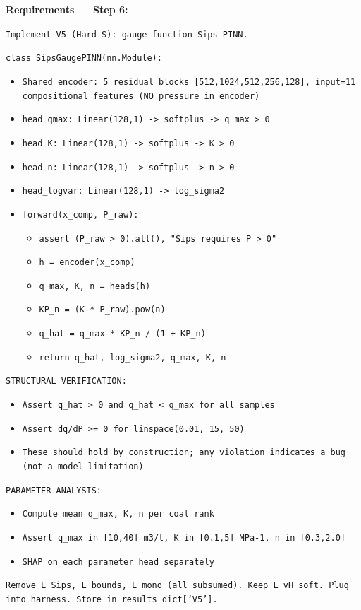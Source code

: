 \documentclass[12pt,a4paper]{article}
\begin{document}
\begin{promptbox}
\textbf{Requirements --- Step 6:}

\texttt{Implement V5 (Hard-S): gauge function Sips PINN.}

\texttt{class SipsGaugePINN(nn.Module):}
\begin{itemize}[noitemsep]
  \item \texttt{Shared encoder: 5 residual blocks [512,1024,512,256,128],
    input=11 compositional features (NO pressure in encoder)}
  \item \texttt{head\_qmax: Linear(128,1) -> softplus -> q\_max > 0}
  \item \texttt{head\_K: Linear(128,1) -> softplus -> K > 0}
  \item \texttt{head\_n: Linear(128,1) -> softplus -> n > 0}
  \item \texttt{head\_logvar: Linear(128,1) -> log\_sigma2}
  \item \texttt{forward(x\_comp, P\_raw):}
  \begin{itemize}[noitemsep]
    \item \texttt{assert (P\_raw > 0).all(), "Sips requires P > 0"}
    \item \texttt{h = encoder(x\_comp)}
    \item \texttt{q\_max, K, n = heads(h)}
    \item \texttt{KP\_n = (K * P\_raw).pow(n)}
    \item \texttt{q\_hat = q\_max * KP\_n / (1 + KP\_n)}
    \item \texttt{return q\_hat, log\_sigma2, q\_max, K, n}
  \end{itemize}
\end{itemize}

\texttt{STRUCTURAL VERIFICATION:}
\begin{itemize}[noitemsep]
  \item \texttt{Assert q\_hat > 0 and q\_hat < q\_max for all samples}
  \item \texttt{Assert dq/dP >= 0 for linspace(0.01, 15, 50)}
  \item \texttt{These should hold by construction; any violation
    indicates a bug (not a model limitation)}
\end{itemize}

\texttt{PARAMETER ANALYSIS:}
\begin{itemize}[noitemsep]
  \item \texttt{Compute mean q\_max, K, n per coal rank}
  \item \texttt{Assert q\_max in [10,40] m3/t, K in [0.1,5] MPa-1,
    n in [0.3,2.0]}
  \item \texttt{SHAP on each parameter head separately}
\end{itemize}

\texttt{Remove L\_Sips, L\_bounds, L\_mono (all subsumed).
Keep L\_vH soft. Plug into harness. Store in results\_dict['V5'].}
\end{promptbox}
\end{document}
